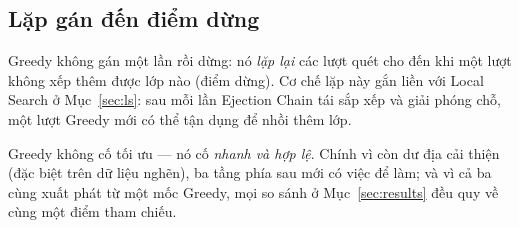 \subsection{Lặp gán đến điểm dừng}
\label{sec:repair}
Greedy không gán một lần rồi dừng: nó \emph{lặp lại} các lượt quét cho đến khi một
lượt không xếp thêm được lớp nào (điểm dừng). Cơ chế lặp này gắn liền với Local
Search ở Mục~\ref{sec:ls}: sau mỗi lần Ejection Chain tái sắp xếp và giải phóng
chỗ, một lượt Greedy mới có thể tận dụng để nhồi thêm lớp.

\begin{remark}
Greedy không cố tối ưu --- nó cố \emph{nhanh và hợp lệ}. Chính vì còn dư địa cải
thiện (đặc biệt trên dữ liệu nghẽn), ba tầng phía sau mới có việc để làm; và vì cả
ba cùng xuất phát từ một mốc Greedy, mọi so sánh ở Mục~\ref{sec:results} đều quy về
cùng một điểm tham chiếu.
\end{remark}
